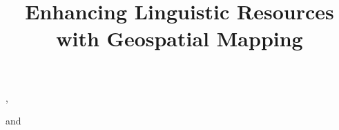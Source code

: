 \documentclass{iosart2c}
\begin{document}
\begin{frontmatter}                           %

\title{Enhancing Linguistic Resources with Geospatial Mapping %
}




\author[A]{ %
},
\author[B,C]{ }
and
\author[D]{ }
\address[A]{Research Unit Quantitative Language Comparison, Ludwig Maximilian University, Geschwister Scholl Platz 1, D-80539 Munich, Germany\\ 
E-mail: bambooforest@gmail.com} %


\address[B]{Department of Intelligent Computer Systems, University of Malta, Msida, MSD2080, Malta}
\address[C]{Computational Linguistics Department, Saarland University, Saarbr\"ucken, 66121, Germany\\  E-mail: littauer@coli.uni-saarland.de}
\address[D]{Intelligent Software Components, iSOCO, S.A., Av. del Partenon 16-18, Madrid, Spain\\
E-mail: bvillazon@isoco.com}


\end{frontmatter}
\end{document}
